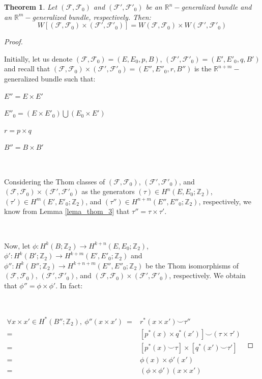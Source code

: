 \documentclass[12pt,oneside]{book}
\newtheorem{teo}    {Theorem}[chapter]
\newcommand{\R}{\mathbb{R}}
\newcommand{\Z}{\mathbb{Z}}
\newcommand{\ccup}{\smile}
\begin{document}
    \begin{teo}\label{res_SW_fht_5}
	Let $(\mathcal{F},\mathcal{F}_{0})$ and $(\mathcal{F'},\mathcal{F'}_{0})$ be an $\R^{n}-$generalized bundle and an $\R^{m}-$generalized 
    bundle, respectively. Then:
	$$ W[(\mathcal{F},\mathcal{F}_{0})\times (\mathcal{F'},\mathcal{F'}_{0})]=W(\mathcal{F},\mathcal{F}_{0})\times W(\mathcal{F'},\mathcal{F'}_{0}) $$
    \end{teo}
    \begin{proof}

        \

    	Initially, let us denote $(\mathcal{F},\mathcal{F}_{0})=(E,E_{0},p,B)$, $(\mathcal{F'},\mathcal{F'}_{0})=(E',E'_{0},q,B')$ and recall 
        that $(\mathcal{F},\mathcal{F}_{0})\times (\mathcal{F'},\mathcal{F'}_{0})=(E'',E''_{0},r,B'')$ is the $\R^{n+m}-$generalized bundle 
        such that:

    	$E''=E\times E'$

    	$E''_{0}=(E\times E'_{0})\bigcup (E_{0}\times E')$

    	$r=p\times q$

    	$B''=B\times B'$

        \

    	Considering the Thom classes of $(\mathcal{F},\mathcal{F}_{0})$, $(\mathcal{F'},\mathcal{F'}_{0})$, and 
        $(\mathcal{F},\mathcal{F}_{0})\times (\mathcal{F'},\mathcal{F'}_{0})$ as the generators 
        $(\tau)\in H^{n}(E,E_{0};\Z_{2})$, $(\tau')\in H^{m}(E',E'_{0};\Z_{2})$, and $(\tau'')\in H^{n+m}(E'',E''_{0};\Z_{2})$, respectively, 
        we know from Lemma \ref{lema_thom_3} that $\tau''=\tau\times\tau'$.

        \

    	Now, let $\phi:H^{k}(B;\Z_{2})\to H^{k+n}(E,E_{0};\Z_{2})$, $\phi':H^{k}(B';\Z_{2})\to H^{k+m}(E',E'_{0};\Z_{2})$ and 
        $\phi'':H^{k}(B'';\Z_{2})\to H^{k+n+m}(E'',E''_{0};\Z_{2})$ be the Thom isomorphisms of 
        $(\mathcal{F},\mathcal{F}_{0})$, $(\mathcal{F'},\mathcal{F'}_{0})$, and 
        $(\mathcal{F},\mathcal{F}_{0})\times (\mathcal{F'},\mathcal{F'}_{0})$, respectively. We obtain that $\phi''=\phi\times\phi'$. In fact:

        \

    	$\begin{array}{rl}
    		\forall x\times x'\in H^{*}(B'';\Z_{2}), \ \phi''(x\times x') \ = & r^{*}(x\times x')\ccup \tau'' \\
    		= & [p^{*}(x)\times q^{*}(x')]\ccup (\tau\times \tau') \\
    		= & [p^{*}(x)\ccup \tau]\times [q^{*}(x')\ccup \tau'] \\
    		= & \phi(x)\times \phi'(x') \\
    		= & (\phi\times\phi')(x\times x')
    	\end{array}$


\end{proof}
\end{document}
